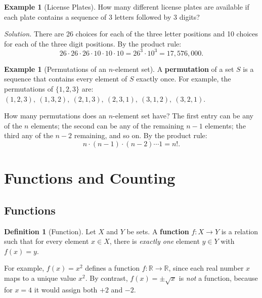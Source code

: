 \documentclass[11pt, a4paper, notitlepage]{report}
\theoremstyle{definition}
\newtheorem{definition}[theorem]{Definition}
\newtheorem{example}[theorem]{Example}
\theoremstyle{remark}
\begin{document}
\begin{example}[License Plates]
\label{ex:license}
How many different license plates are available if each plate contains a sequence of 3 letters
followed by 3 digits?

\textit{Solution.} There are 26 choices for each of the three letter positions and 10 choices
for each of the three digit positions. By the product rule:
\[
  26 \cdot 26 \cdot 26 \cdot 10 \cdot 10 \cdot 10 = 26^3 \cdot 10^3 = 17{,}576{,}000.
\]
\end{example}

\begin{example}[Permutations of an $n$-element set]
\label{ex:permutation}
A \textbf{permutation} of a set $S$ is a sequence that contains every element of $S$ exactly
once. For example, the permutations of $\{1, 2, 3\}$ are:
$(1,2,3),\ (1,3,2),\ (2,1,3),\ (2,3,1),\ (3,1,2),\ (3,2,1).$

How many permutations does an $n$-element set have? The first entry can be any of the $n$
elements; the second can be any of the remaining $n-1$ elements; the third any of the $n-2$
remaining, and so on. By the product rule:
\[
  n \cdot (n-1) \cdot (n-2) \cdots 1 = n!.
\]
\end{example}

\section{Functions and Counting}

\subsection{Functions}

\begin{definition}[Function]
\label{def:function}
Let $X$ and $Y$ be sets. A \textbf{function} $f: X \to Y$ is a relation such that for every
element $x \in X$, there is \emph{exactly one} element $y \in Y$ with $f(x) = y$.
\end{definition}

For example, $f(x) = x^2$ defines a function $f: \mathbb{R} \to \mathbb{R}$, since each real
number $x$ maps to a unique value $x^2$. By contrast, $f(x) = \pm\sqrt{x}$ is \emph{not} a
function, because for $x = 4$ it would assign both $+2$ and $-2$.
\end{document}
